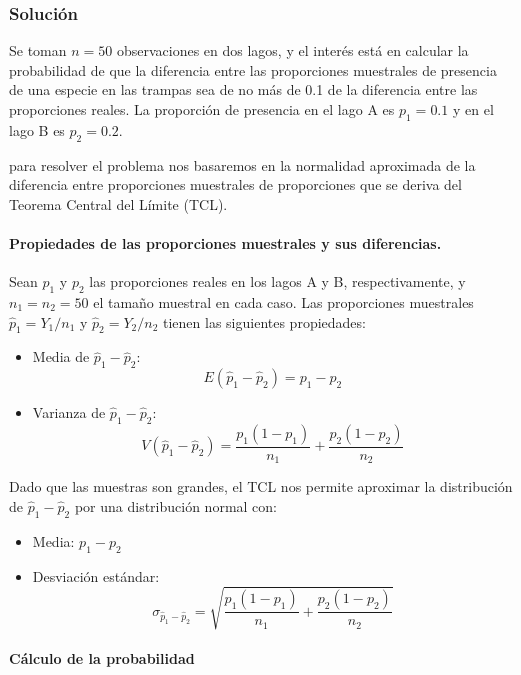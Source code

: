 \documentclass[
]{article}
\providecommand{\tightlist}{%
  \setlength{\itemsep}{0pt}\setlength{\parskip}{0pt}}
\begin{document}
\subsubsection{Solución}\label{soluciuxf3n-11}

Se toman \(n = 50\) observaciones en dos lagos, y el interés está en calcular la probabilidad de que la diferencia entre las proporciones muestrales de presencia de una especie en las trampas sea de no más de 0.1 de la diferencia entre las proporciones reales. La proporción de presencia en el lago A es \(p_1 = 0.1\) y en el lago B es \(p_2 = 0.2\).

para resolver el problema nos basaremos en la normalidad aproximada de la diferencia entre proporciones muestrales de proporciones que se deriva del Teorema Central del Límite (TCL).

\paragraph{Propiedades de las proporciones muestrales y sus diferencias.}\label{propiedades-de-las-proporciones-muestrales-y-sus-diferencias.}

Sean \(p_1\) y \(p_2\) las proporciones reales en los lagos A y B, respectivamente, y \(n_1 = n_2 = 50\) el tamaño muestral en cada caso. Las proporciones muestrales \(\hat{p}_1 = Y_1 / n_1\) y \(\hat{p}_2 = Y_2 / n_2\) tienen las siguientes propiedades:

\begin{itemize}
\item
  Media de \(\hat{p}_1 - \hat{p}_2\):
  \[
  E(\hat{p}_1 - \hat{p}_2) = p_1 - p_2
  \]
\item
  Varianza de \(\hat{p}_1 - \hat{p}_2\):
  \[
  V(\hat{p}_1 - \hat{p}_2) = \frac{p_1(1 - p_1)}{n_1} + \frac{p_2(1 - p_2)}{n_2}
  \]
\end{itemize}

Dado que las muestras son grandes, el TCL nos permite aproximar la distribución de \(\hat{p}_1 - \hat{p}_2\) por una distribución normal con:

\begin{itemize}
\tightlist
\item
  Media: \(p_1 - p_2\)
\item
  Desviación estándar:
  \[
  \sigma_{\hat{p}_1 - \hat{p}_2} = \sqrt{\frac{p_1(1 - p_1)}{n_1} + \frac{p_2(1 - p_2)}{n_2}}
  \]
\end{itemize}

\paragraph{Cálculo de la probabilidad}\label{cuxe1lculo-de-la-probabilidad-2}
\end{document}

